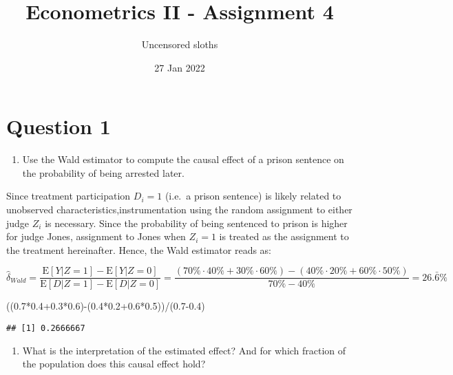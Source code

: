 \documentclass[
]{article}
\title{Econometrics II - Assignment 4}
\author{Uncensored sloths}
\date{27 Jan 2022}
\newenvironment{Shaded}{\begin{snugshade}}{\end{snugshade}}
\newcommand{\FloatTok}[1]{\textcolor[rgb]{0.00,0.00,0.81}{#1}}
\newcommand{\NormalTok}[1]{#1}
\newcommand{\SpecialCharTok}[1]{\textcolor[rgb]{0.00,0.00,0.00}{#1}}
\providecommand{\tightlist}{%
  \setlength{\itemsep}{0pt}\setlength{\parskip}{0pt}}
\begin{document}
\maketitle

\hypertarget{question-1}{%
\section{Question 1}\label{question-1}}

\begin{enumerate}
\def\labelenumi{\alph{enumi})}
\tightlist
\item
  Use the Wald estimator to compute the causal effect of a prison
  sentence on the probability of being arrested later.
\end{enumerate}

Since treatment participation \(D_i=1\) (i.e.~a prison sentence) is
likely related to unobserved characteristics,instrumentation using the
random assignment to either judge \(Z_i\) is necessary. Since the
probability of being sentenced to prison is higher for judge Jones,
assignment to Jones when \(Z_i=1\) is treated as the assignment to the
treatment hereinafter. Hence, the Wald estimator reads as:

\[
\hat{\delta}_{Wald}=\frac{\mathrm{E}[Y|Z=1]-\mathrm{E}[Y|Z=0]}{\mathrm{E}[D|Z=1]-\mathrm{E}[D|Z=0]}=\frac{(70\%\cdot40\%+30\%\cdot60\%)-(40\%\cdot20\%+60\%\cdot50\%)}{70\%-40\%}=26.\bar{6}\%
\]

\begin{Shaded}
\begin{Highlighting}[]
\NormalTok{((}\FloatTok{0.7}\SpecialCharTok{*}\FloatTok{0.4+0.3}\SpecialCharTok{*}\FloatTok{0.6}\NormalTok{)}\SpecialCharTok{{-}}\NormalTok{(}\FloatTok{0.4}\SpecialCharTok{*}\FloatTok{0.2+0.6}\SpecialCharTok{*}\FloatTok{0.5}\NormalTok{))}\SpecialCharTok{/}\NormalTok{(}\FloatTok{0.7{-}0.4}\NormalTok{)}
\end{Highlighting}
\end{Shaded}

\begin{verbatim}
## [1] 0.2666667
\end{verbatim}

\begin{enumerate}
\def\labelenumi{\alph{enumi})}
\setcounter{enumi}{1}
\tightlist
\item
  What is the interpretation of the estimated effect? And for which
  fraction of the population does this causal effect hold?
\end{enumerate}
\end{document}
